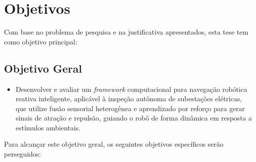 \section{Objetivos}
Com base no problema de pesquisa e na justificativa apresentados, esta tese tem como objetivo principal:

\subsection{Objetivo Geral}
\begin{itemize}
    \item Desenvolver e avaliar um \textit{framework} computacional para navegação robótica reativa inteligente, aplicável à inspeção autônoma de subestações elétricas, que utilize fusão sensorial heterogênea e aprendizado por reforço para gerar sinais de atração e repulsão, guiando o robô de forma dinâmica em resposta a estímulos ambientais.
    
\end{itemize}
Para alcançar este objetivo geral, os seguintes objetivos específicos serão perseguidos:

